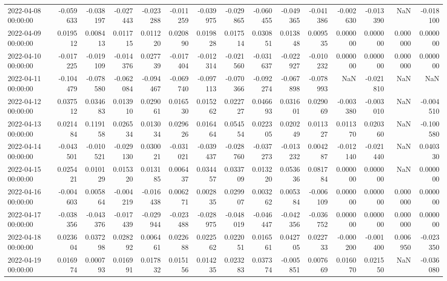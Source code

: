 \begin{tabular}{lrrrrrrrrrrrrrr}
2022-04-08 00:00:00 & -0.059633 & -0.038197 & -0.027443 & -0.023288 & -0.011259 & -0.039975 & -0.029865 & -0.060455 & -0.049365 & -0.041386 & -0.002630 & -0.013390 & NaN & -0.018100 \\
2022-04-09 00:00:00 & 0.019512 & 0.008413 & 0.011715 & 0.011220 & 0.020890 & 0.019828 & 0.017514 & 0.030851 & 0.013848 & 0.009535 & 0.000000 & 0.000000 & 0.000000 & 0.000000 \\
2022-04-10 00:00:00 & -0.017225 & -0.019109 & -0.014376 & 0.027739 & -0.017404 & -0.012314 & -0.021560 & -0.031637 & -0.022927 & -0.010232 & 0.000000 & 0.000000 & 0.000000 & 0.000000 \\
2022-04-11 00:00:00 & -0.104479 & -0.078580 & -0.062084 & -0.094467 & -0.069740 & -0.097113 & -0.070366 & -0.092274 & -0.067898 & -0.078993 & NaN & -0.021810 & NaN & NaN \\
2022-04-12 00:00:00 & 0.037512 & 0.034683 & 0.013910 & 0.029061 & 0.016530 & 0.015262 & 0.022727 & 0.046693 & 0.031601 & 0.029069 & -0.003380 & -0.003010 & NaN & -0.004510 \\
2022-04-13 00:00:00 & 0.021484 & 0.119158 & 0.026534 & 0.013034 & 0.029626 & 0.016464 & 0.054554 & 0.022305 & 0.020249 & 0.011327 & 0.011370 & 0.020360 & NaN & -0.100580 \\
2022-04-14 00:00:00 & -0.043501 & -0.010521 & -0.029130 & 0.030021 & -0.031021 & -0.039437 & -0.028760 & -0.037273 & -0.013232 & 0.004287 & -0.012140 & -0.021440 & NaN & 0.040330 \\
2022-04-15 00:00:00 & 0.025421 & 0.010129 & 0.015320 & 0.013185 & 0.006437 & 0.034457 & 0.033709 & 0.013220 & 0.053636 & 0.081784 & 0.000000 & 0.000000 & NaN & 0.000000 \\
2022-04-16 00:00:00 & -0.004603 & 0.005864 & -0.004219 & -0.016438 & 0.006271 & 0.002835 & 0.029907 & 0.003262 & 0.005384 & -0.006109 & 0.000000 & 0.000000 & 0.000000 & 0.000000 \\
2022-04-17 00:00:00 & -0.038356 & -0.043376 & -0.017439 & -0.029944 & -0.023488 & -0.028975 & -0.048019 & -0.046447 & -0.042356 & -0.036752 & 0.000000 & 0.000000 & 0.000000 & 0.000000 \\
2022-04-18 00:00:00 & 0.023604 & 0.037298 & 0.028292 & 0.006461 & 0.022688 & 0.022562 & 0.022051 & 0.016561 & 0.042705 & 0.022733 & -0.000200 & -0.001400 & 0.006950 & -0.023350 \\
2022-04-19 00:00:00 & 0.016974 & 0.000793 & 0.016991 & 0.017832 & 0.015156 & 0.014235 & 0.023283 & 0.037374 & -0.005851 & 0.007669 & 0.016070 & 0.021550 & NaN & -0.036080 \\

\end{tabular}
